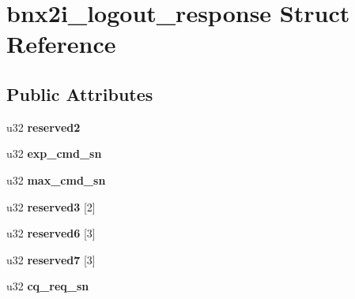 \hypertarget{structbnx2i__logout__response}{
\section{bnx2i\_\-logout\_\-response Struct Reference}
\label{structbnx2i__logout__response}
}
\subsection*{Public Attributes}
\begin{DoxyCompactItemize}
\item 
\hypertarget{structbnx2i__logout__response_ac552e1291d24f4140ba18a5eb593a8e3}{
u32 {\bfseries reserved2}}
\label{structbnx2i__logout__response_ac552e1291d24f4140ba18a5eb593a8e3}

\item 
\hypertarget{structbnx2i__logout__response_adf4a10c56b76e53a64f08ddae477ec82}{
u32 {\bfseries exp\_\-cmd\_\-sn}}
\label{structbnx2i__logout__response_adf4a10c56b76e53a64f08ddae477ec82}

\item 
\hypertarget{structbnx2i__logout__response_a4ba53c77c2d77df46a04698e2c549fc2}{
u32 {\bfseries max\_\-cmd\_\-sn}}
\label{structbnx2i__logout__response_a4ba53c77c2d77df46a04698e2c549fc2}

\item 
\hypertarget{structbnx2i__logout__response_ac834f1f519fc2eeaded230b0b3020175}{
u32 {\bfseries reserved3} \mbox{[}2\mbox{]}}
\label{structbnx2i__logout__response_ac834f1f519fc2eeaded230b0b3020175}

\item 
\hypertarget{structbnx2i__logout__response_a407ee1466e28c711fafae1cc3552b99a}{
u32 {\bfseries reserved6} \mbox{[}3\mbox{]}}
\label{structbnx2i__logout__response_a407ee1466e28c711fafae1cc3552b99a}

\item 
\hypertarget{structbnx2i__logout__response_a58f8437e8e595d5c2b0d2dc5379142cc}{
u32 {\bfseries reserved7} \mbox{[}3\mbox{]}}
\label{structbnx2i__logout__response_a58f8437e8e595d5c2b0d2dc5379142cc}

\item 
\hypertarget{structbnx2i__logout__response_a398acdae8f6b1a1c82c65ea149dd0380}{
u32 {\bfseries cq\_\-req\_\-sn}}
\label{structbnx2i__logout__response_a398acdae8f6b1a1c82c65ea149dd0380}

\end{DoxyCompactItemize}


